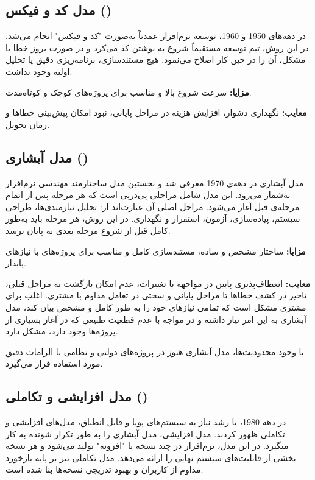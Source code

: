 \subsection{مدل کد و فیکس ()}
در دهه‌های 1950 و 1960، توسعه نرم‌افزار عمدتاً به‌صورت "کد و فیکس" انجام می‌شد. در این روش، تیم توسعه مستقیماً شروع به نوشتن کد می‌کرد و در صورت بروز خطا یا مشکل، آن را در حین کار اصلاح می‌نمود. هیچ مستندسازی، برنامه‌ریزی دقیق یا تحلیل اولیه وجود نداشت.\cite{Software-development-history}

\noindent \textbf{مزایا:} سرعت شروع بالا و مناسب برای پروژه‌های کوچک و کوتاه‌مدت.\cite{Software-development-history}

\noindent \textbf{معایب:} نگهداری دشوار، افزایش هزینه در مراحل پایانی، نبود امکان پیش‌بینی خطاها و زمان تحویل.\cite{Software-development-history}



\subsection{مدل آبشاری ()}
مدل آبشاری در دهه‌ی 1970 معرفی شد و نخستین مدل ساختارمند مهندسی نرم‌افزار به‌شمار می‌رود. این مدل شامل مراحلی پی‌در‌پی است که هر مرحله پس از اتمام مرحله‌ی قبل آغاز می‌شود. مراحل اصلی آن عبارت‌اند از: تحلیل نیازمندی‌ها، طراحی سیستم، پیاده‌سازی، آزمون، استقرار و نگهداری. در این روش، هر مرحله باید به‌طور کامل قبل از شروع مرحله بعدی به پایان برسد.\cite{Software-development-history}

\noindent \textbf{مزایا:} ساختار مشخص و ساده، مستندسازی کامل و مناسب برای پروژه‌های با نیازهای پایدار.\cite{Software-development-history}

\noindent \textbf{معایب:} انعطاف‌پذیری پایین در مواجهه با تغییرات، عدم امکان بازگشت به مراحل قبلی، تاخیر در کشف خطاها تا مراحل پایانی و سختی در تعامل مداوم با مشتری. اغلب برای مشتری مشکل است که تمامی نیازهای خود را به طور کامل و مشخص بیان کند، مدل آبشاری به این امر نیاز داشته و در مواجه با عدم قطعیت طبیعی که در آغاز بسیاری از پروژه‌ها وجود دارد، مشکل دارد.\cite{Software-development-history}

با وجود محدودیت‌ها، مدل آبشاری هنوز در پروژه‌های دولتی و نظامی با الزامات دقیق مورد استفاده قرار می‌گیرد.\cite{Software-development-history}

\subsection{مدل افزایشی و تکاملی ()}
در دهه 1980، با رشد نیاز به سیستم‌های پویا و قابل انطباق، مدل‌های افزایشی و تکاملی ظهور کردند. مدل افزایشی، مدل آبشاری را به طور تکرار شونده به کار میگیرد. در این مدل، نرم‌افزار در چند نسخه یا "افزونه" تولید می‌شود و هر نسخه بخشی از قابلیت‌های سیستم نهایی را ارائه می‌دهد. مدل تکاملی نیز بر پایه بازخورد مداوم از کاربران و بهبود تدریجی نسخه‌ها بنا شده است.\cite{Software-development-history}

